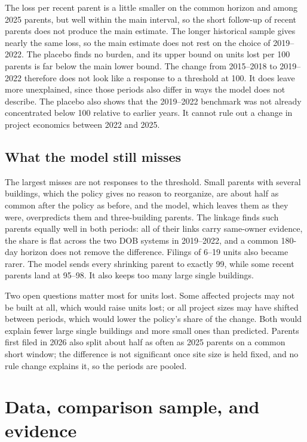 \documentclass[11pt]{article}
\begin{document}
The loss per recent parent is a little smaller on the common horizon and among 2025 parents, but well within the main interval, so the short follow-up of recent parents does not produce the main estimate. The longer historical sample gives nearly the same loss, so the main estimate does not rest on the choice of 2019--2022. The placebo finds no burden, and its upper bound on units lost per 100 parents is far below the main lower bound. The change from 2015--2018 to 2019--2022 therefore does not look like a response to a threshold at 100. It does leave more unexplained, since those periods also differ in ways the model does not describe. The placebo also shows that the 2019--2022 benchmark was not already concentrated below 100 relative to earlier years. It cannot rule out a change in project economics between 2022 and 2025.

\subsection{What the model still misses}

The largest misses are not responses to the threshold. Small parents with several buildings, which the policy gives no reason to reorganize, are about half as common after the policy as before, and the model, which leaves them as they were, overpredicts them and three-building parents. The linkage finds such parents equally well in both periods: all of their links carry same-owner evidence, the share is flat across the two DOB systems in 2019--2022, and a common 180-day horizon does not remove the difference. Filings of 6--19 units also became rarer. The model sends every shrinking parent to exactly 99, while some recent parents land at 95--98. It also keeps too many large single buildings.

Two open questions matter most for units lost. Some affected projects may not be built at all, which would raise units lost; or all project sizes may have shifted between periods, which would lower the policy's share of the change. Both would explain fewer large single buildings and more small ones than predicted. Parents first filed in 2026 also split about half as often as 2025 parents on a common short window; the difference is not significant once site size is held fixed, and no rule change explains it, so the periods are pooled.

\appendix
\section{Data, comparison sample, and evidence}
\label{app:data}
\end{document}
